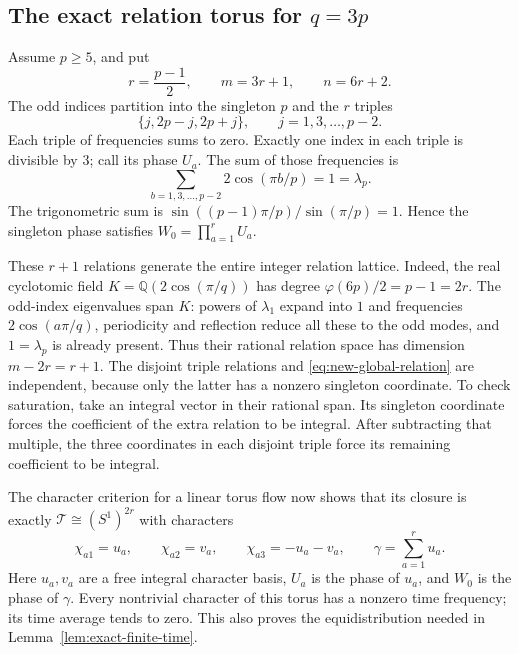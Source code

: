 \documentclass[11pt,a4paper]{article}
\theoremstyle{definition}\newtheorem{definition}[theorem]{Definition}
\theoremstyle{remark}\newtheorem{remark}[theorem]{Remark}
\begin{document}
\subsection{The exact relation torus for \texorpdfstring{$q=3p$}{q=3p}}
Assume $p\geq5$, and put
\[
 r=\frac{p-1}{2},\qquad m=3r+1,\qquad n=6r+2.
\]
The odd indices partition into the singleton $p$ and the $r$ triples
\[
 \{j,2p-j,2p+j\},\qquad j=1,3,\ldots,p-2.
\]
Each triple of frequencies sums to zero. Exactly one index in each
triple is divisible by $3$; call its phase $U_a$. The sum of those
frequencies is
\begin{equation}\label{eq:new-global-relation}
 \sum_{b=1,3,\ldots,p-2}2\cos(\pi b/p)=1=\lambda_p.
\end{equation}
The trigonometric sum is $\sin((p-1)\pi/p)/\sin(\pi/p)=1$.
Hence the singleton phase satisfies $W_0=\prod_{a=1}^r U_a$.

These $r+1$ relations generate the entire integer relation lattice.
Indeed, the real cyclotomic field $K=\mathbb Q(2\cos(\pi/q))$ has
degree $\varphi(6p)/2=p-1=2r$. The odd-index eigenvalues span $K$:
powers of $\lambda_1$ expand into $1$ and frequencies
$2\cos(a\pi/q)$, periodicity and reflection reduce all these to the
odd modes, and $1=\lambda_p$ is already present. Thus their rational
relation space has dimension $m-2r=r+1$. The disjoint triple relations
and \eqref{eq:new-global-relation} are independent, because only the
latter has a nonzero singleton coordinate. To check saturation, take
an integral vector in their rational span. Its singleton coordinate
forces the coefficient of the extra relation to be integral. After
subtracting that multiple, the three coordinates in each disjoint
triple force its remaining coefficient to be integral.

The character criterion for a linear torus flow now shows that its
closure is exactly $\mathcal T\cong(S^1)^{2r}$ with characters
\begin{equation}\label{eq:new-three-torus}
 \chi_{a1}=u_a,\qquad \chi_{a2}=v_a,\qquad
 \chi_{a3}=-u_a-v_a,\qquad
 \gamma=\sum_{a=1}^r u_a.
\end{equation}
Here $u_a,v_a$ are a free integral character basis, $U_a$ is the phase
of $u_a$, and $W_0$ is the phase of $\gamma$.
Every nontrivial character of this torus has a nonzero time frequency;
its time average tends to zero. This also proves the equidistribution
needed in Lemma~\ref{lem:exact-finite-time}.
\end{document}
